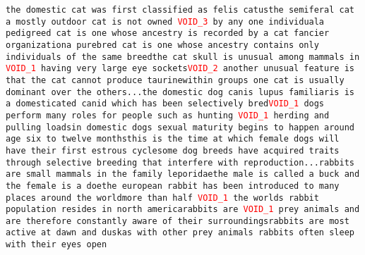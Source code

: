 \texttt{the domestic cat was first classified as felis catus\newline the semiferal cat a mostly outdoor cat is not owned \textcolor{red}{VOID\_3} by any one individual\newline a pedigreed cat is one whose ancestry is recorded by a cat fancier organization\newline a purebred cat is one whose ancestry contains only individuals of the same breed\newline the cat skull is unusual among mammals in \textcolor{red}{VOID\_1} having very large eye sockets\newline \textcolor{red}{VOID\_2} another unusual feature is that the cat cannot produce taurine\newline within groups one cat is usually dominant over the others\newline ...\newline the domestic dog canis lupus familiaris is a domesticated canid which has been selectively bred\newline \textcolor{red}{VOID\_1} dogs perform many roles for people such as hunting \textcolor{red}{VOID\_1} herding and pulling loads\newline in domestic dogs sexual maturity begins to happen around age six to twelve months\newline this is the time at which female dogs will have their first estrous cycle\newline some dog breeds have acquired traits through selective breeding that interfere with reproduction\newline ...\newline rabbits are small mammals in the family leporidae\newline the male is called a buck and the female is a doe\newline the european rabbit has been introduced to many places around the world\newline more than half \textcolor{red}{VOID\_1} the worlds rabbit population resides in north america\newline rabbits are \textcolor{red}{VOID\_1} prey animals and are therefore constantly aware of their surroundings\newline rabbits are most active at dawn and dusk\newline as with other prey animals rabbits often sleep with their eyes open}